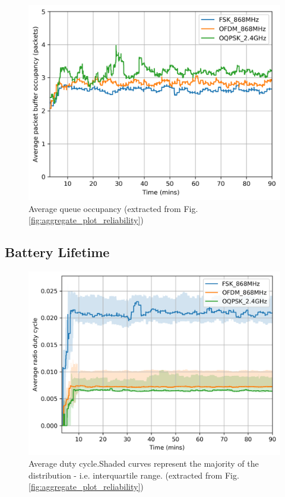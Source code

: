 \documentclass[journal]{IEEEtran}
\begin{document}
\begin{figure}
	\centering
	\includegraphics[width=0.90\columnwidth]{avg_bufferSize_plot}
	\caption{Average queue occupancy (extracted from Fig. \ref{fig:aggregate_plot_reliability})}
    \label{fig:avg_bufferSize_plot}
\end{figure}

\subsection{Battery Lifetime}
\label{sec:battery_lifetime}


\begin{figure}
	\centering
	\includegraphics[width=0.90\columnwidth]{avg_avg_dutyCycle_plot}
	\caption{Average duty cycle.Shaded curves represent the majority of the distribution - i.e. interquartile range. (extracted from Fig. \ref{fig:aggregate_plot_reliability})}
    \label{fig:avg_avg_dutyCycle_plot}
\end{figure}
\end{document}
